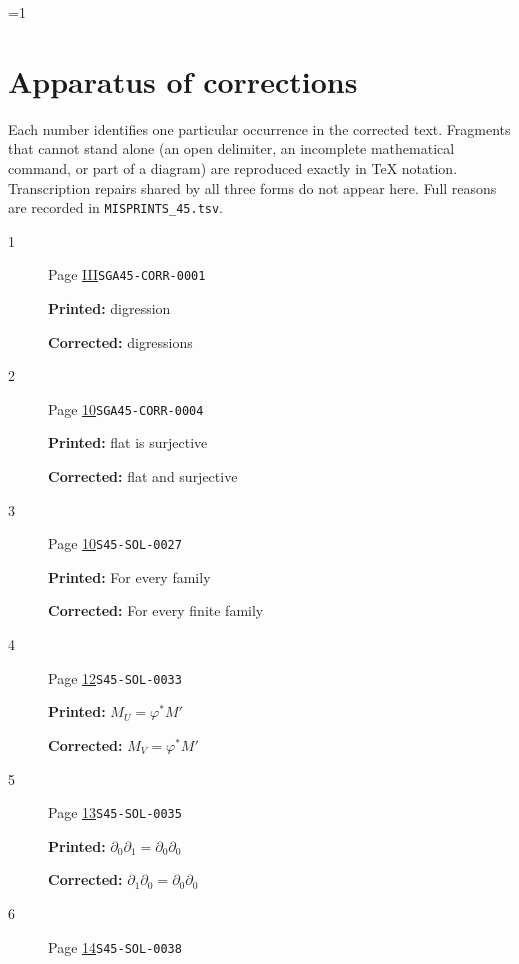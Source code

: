 \documentclass[oneside]{book}
\theoremstyle{sga-source}
\theoremstyle{sga-source-dash}
\theoremstyle{sga-source-dotdash}
\theoremstyle{sga-source-number-note-dash}
\theoremstyle{sga-source-note-number-dotdash}
\theoremstyle{sga-source-example-dotdash}
\theoremstyle{sga-source-inline-number}
\theoremstyle{sga-source-bare-number}
\theoremstyle{sga-source}
\providecommand\EditionMode{1}
\begin{document}
\ifnum\EditionMode=1\relax
\clearpage
\chapter*{Apparatus of corrections}
Each number identifies one particular occurrence in the corrected text. Fragments that cannot stand alone (an open delimiter, an incomplete mathematical command, or part of a diagram) are reproduced exactly in TeX notation. Transcription repairs shared by all three forms do not appear here. Full reasons are recorded in \texttt{MISPRINTS\_45.tsv}.
\begingroup\small
\begin{description}
\item[\hypertarget{apparatus:EN-0001}{1}] Page \hyperlink{printpage:en:III}{III}\quad\texttt{SGA45-CORR-0001}
\par\noindent\textbf{Printed:} digression
\par\noindent\textbf{Corrected:} digressions
\smallskip
\item[\hypertarget{apparatus:EN-0002}{2}] Page \hyperlink{printpage:en:10}{10}\quad\texttt{SGA45-CORR-0004}
\par\noindent\textbf{Printed:} flat is surjective
\par\noindent\textbf{Corrected:} flat and surjective
\smallskip
\item[\hypertarget{apparatus:EN-0003}{3}] Page \hyperlink{printpage:en:10}{10}\quad\texttt{S45-SOL-0027}
\par\noindent\textbf{Printed:} For every family
\par\noindent\textbf{Corrected:} For every finite family
\smallskip
\item[\hypertarget{apparatus:EN-0004}{4}] Page \hyperlink{printpage:en:12}{12}\quad\texttt{S45-SOL-0033}
\par\noindent\textbf{Printed:} \(M_U=\varphi^*M'\)
\par\noindent\textbf{Corrected:} \(M_V=\varphi^*M'\)
\smallskip
\item[\hypertarget{apparatus:EN-0005}{5}] Page \hyperlink{printpage:en:13}{13}\quad\texttt{S45-SOL-0035}
\par\noindent\textbf{Printed:} \(\partial_0\partial_1=\partial_0\partial_0\)
\par\noindent\textbf{Corrected:} \(\partial_1\partial_0=\partial_0\partial_0\)
\smallskip
\item[\hypertarget{apparatus:EN-0006}{6}] Page \hyperlink{printpage:en:14}{14}\quad\texttt{S45-SOL-0038}

\end{description}
\end{document}
